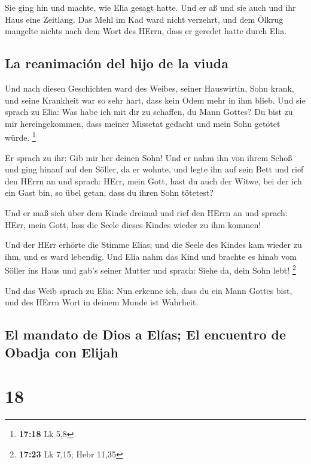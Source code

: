  Sie ging hin und machte, wie Elia gesagt hatte. Und er
aß und sie auch und ihr Haus eine Zeitlang.  Das Mehl im
Kad ward nicht verzehrt, und dem Ölkrug mangelte nichts nach dem Wort
des HErrn, dass er geredet hatte durch Elia.

\hypertarget{la-reanimaciuxf3n-del-hijo-de-la-viuda}{%
\subsection{La reanimación del hijo de la
viuda}\label{la-reanimaciuxf3n-del-hijo-de-la-viuda}}

 Und nach diesen Geschichten ward des Weibes, seiner
Hauswirtin, Sohn krank, und seine Krankheit war so sehr hart, dass kein
Odem mehr in ihm blieb.  Und sie sprach zu Elia: Was habe
ich mit dir zu schaffen, du Mann Gottes? Du bist zu mir hereingekommen,
dass meiner Missetat gedacht und mein Sohn getötet würde. \footnote{\textbf{17:18}
  Lk 5,8}

 Er sprach zu ihr: Gib mir her deinen Sohn! Und er nahm
ihn von ihrem Schoß und ging hinauf auf den Söller, da er wohnte, und
legte ihn auf sein Bett  und rief den HErrn an und
sprach: HErr, mein Gott, hast du auch der Witwe, bei der ich ein Gast
bin, so übel getan, dass du ihren Sohn tötetest?

 Und er maß sich über dem Kinde dreimal und rief den
HErrn an und sprach: HErr, mein Gott, lass die Seele dieses Kindes
wieder zu ihm kommen!

 Und der HErr erhörte die Stimme Elias; und die Seele des
Kindes kam wieder zu ihm, und es ward lebendig.  Und Elia
nahm das Kind und brachte es hinab vom Söller ins Haus und gab's seiner
Mutter und sprach: Siehe da, dein Sohn lebt! \footnote{\textbf{17:23} Lk
  7,15; Hebr 11,35}

 Und das Weib sprach zu Elia: Nun erkenne ich, dass du
ein Mann Gottes bist, und des HErrn Wort in deinem Munde ist Wahrheit.

\hypertarget{el-mandato-de-dios-a-eluxedas-el-encuentro-de-obadja-con-elijah}{%
\subsection{El mandato de Dios a Elías; El encuentro de Obadja con
Elijah}\label{el-mandato-de-dios-a-eluxedas-el-encuentro-de-obadja-con-elijah}}

\hypertarget{section-17}{%
\section{18}\label{section-17}}

